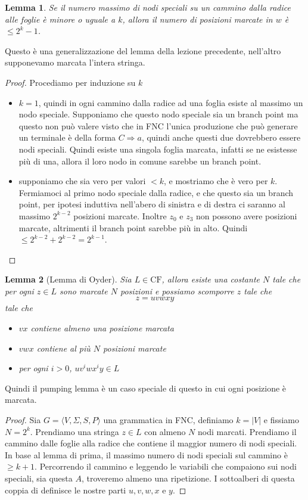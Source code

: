 \documentclass[12pt]{article}
\newtheorem{lemma}{Lemma}
\begin{document}
\begin{itemize}
\begin{lemma}
	Se il numero massimo di nodi speciali su un cammino dalla radice alle foglie è minore o uguale a $k$, allora il numero di posizioni marcate in $w$ è $\leq 2^k - 1$.
\end{lemma}
Questo è una generalizzazione del lemma della lezione precedente, nell'altro supponevamo marcata l'intera stringa.

\begin{proof}
	Procediamo per induzione su $k$
	\begin{itemize}
		\item $k = 1$, quindi in ogni cammino dalla radice ad una foglia esiste al massimo un nodo speciale.
			Supponiamo che questo nodo speciale sia un branch point
			ma questo non può valere visto che in FNC l'unica produzione che può generare un terminale è della forma $C \Rightarrow a$, quindi anche questi due dovrebbero essere nodi speciali.
			Quindi esiste una singola foglia marcata, infatti se ne esistesse più di una, allora il loro nodo in comune sarebbe un branch point.
		\item supponiamo che sia vero per valori $< k$, e mostriamo che è vero per $k$.
			Fermiamoci al primo nodo speciale dalla radice, e che questo sia un branch point, per ipotesi induttiva nell'abero di sinistra e di destra ci saranno al massimo $2^{k - 2}$ posizioni marcate.
			Inoltre $z_0$ e $z_3$ non possono avere posizioni marcate, altrimenti il branch point sarebbe più in alto.
			Quindi $\leq 2^{k - 2} + 2^{k - 2} = 2^{k - 1}$.
	\end{itemize}
\end{proof}
\begin{lemma}[Lemma di Oyder]
	Sia $L \in \text{CF}$, allora esiste una costante $N$ tale che per ogni $z \in L$ sono marcate $N$ posizioni e possiamo scomporre $z$ tale che
	$$ z = u v w x y $$
	tale che
	\begin{itemize}
		\item $vx$ contiene almeno una posizione marcata
		\item $vwx$ contiene al più $N$ posizioni marcate
		\item per ogni $i > 0$, $u v^i w x^i y \in L$
	\end{itemize}
\end{lemma}
Quindi il pumping lemma è un caso speciale di questo in cui ogni posizione è marcata.
\begin{proof}
	Sia $G = \langle V, \Sigma, S, P \rangle$ una grammatica in FNC, definiamo $k = |V|$ e fissiamo $N = 2^k$.
	Prendiamo una stringa $z \in L$ con almeno $N$ nodi marcati.
	Prendiamo il cammino dalle foglie alla radice che contiene il maggior numero di nodi speciali.
	In base al lemma di prima, il massimo numero di nodi speciali sul cammino è $\geq k + 1$.
	Percorrendo il cammino e leggendo le variabili che compaiono sui nodi speciali, sia questa $A$, troveremo almeno una ripetizione.
	I sottoalberi di questa coppia di definisce le nostre parti $u, v, w, x$ e $y$.


\end{proof}
\end{itemize}
\end{document}
